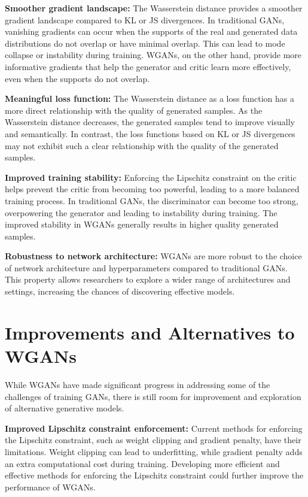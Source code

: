     \textbf{Smoother gradient landscape:} The Wasserstein distance provides a smoother gradient landscape compared to KL or JS divergences. In traditional GANs, vanishing gradients can occur when the supports of the real and generated data distributions do not overlap or have minimal overlap. This can lead to mode collapse or instability during training. WGANs, on the other hand, provide more informative gradients that help the generator and critic learn more effectively, even when the supports do not overlap.

    \textbf{Meaningful loss function:} The Wasserstein distance as a loss function has a more direct relationship with the quality of generated samples. As the Wasserstein distance decreases, the generated samples tend to improve visually and semantically. In contrast, the loss functions based on KL or JS divergences may not exhibit such a clear relationship with the quality of the generated samples.

    \textbf{Improved training stability:} Enforcing the Lipschitz constraint on the critic helps prevent the critic from becoming too powerful, leading to a more balanced training process. In traditional GANs, the discriminator can become too strong, overpowering the generator and leading to instability during training. The improved stability in WGANs generally results in higher quality generated samples.

    \textbf{Robustness to network architecture:} WGANs are more robust to the choice of network architecture and hyperparameters compared to traditional GANs. This property allows researchers to explore a wider range of architectures and settings, increasing the chances of discovering effective models.

\section{Improvements and Alternatives to WGANs}

While WGANs have made significant progress in addressing some of the challenges of training GANs, there is still room for improvement and exploration of alternative generative models.

    \textbf{Improved Lipschitz constraint enforcement:} Current methods for enforcing the Lipschitz constraint, such as weight clipping and gradient penalty, have their limitations. Weight clipping can lead to underfitting, while gradient penalty adds an extra computational cost during training. Developing more efficient and effective methods for enforcing the Lipschitz constraint could further improve the performance of WGANs.

